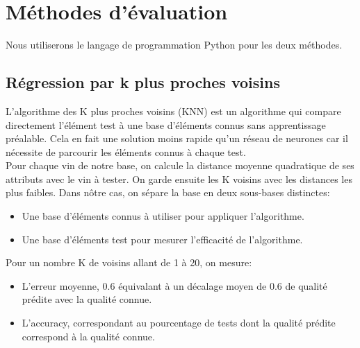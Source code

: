 \section{Méthodes d'évaluation}

Nous utiliserons le langage de programmation Python pour les deux méthodes.

\subsection{Régression par k plus proches voisins}

L'algorithme des K plus proches voisins (KNN) est un algorithme qui compare directement l'élément test à
une base d'éléments connus sans apprentissage préalable. Cela en fait une solution moins rapide qu'un réseau
de neurones car il nécessite de parcourir les éléments connus à chaque test.\\

Pour chaque vin de notre base, on calcule la distance moyenne quadratique de ses attributs avec le vin à tester.
On garde ensuite les K voisins avec les distances les plus faibles. Dans nôtre cas, on sépare la base en deux sous-bases
distinctes:

\vspace{0.5cm}

\begin{itemize}
    \item Une base d'éléments connus à utiliser pour appliquer l'algorithme.
    \item Une base d'éléments test pour mesurer l'efficacité de l'algorithme.
\end{itemize}

\vspace{0.5cm}

Pour un nombre K de voisins allant de 1 à 20, on mesure:
\vspace{0.5cm}

\begin{itemize}
    \item L'erreur moyenne, 0.6 équivalant à un décalage moyen de 0.6 de qualité prédite avec la qualité connue.
    \item L'accuracy, correspondant au pourcentage de tests dont la qualité prédite correspond à la qualité connue.
\end{itemize}

\vspace{0.5cm}

